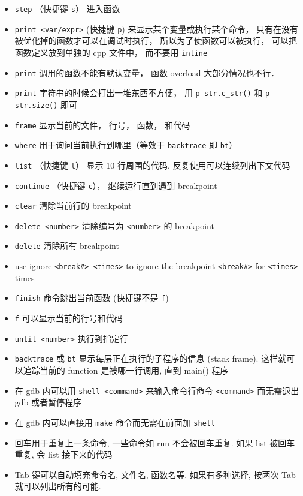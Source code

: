 \begin{itemize}
\item \verb`step` （快捷键 \verb`s`） 进入函数
\item \verb`print <var/expr>` (快捷键 \verb`p`) 来显示某个变量或执行某个命令， 只有在没有被优化掉的函数才可以在调试时执行， 所以为了使函数可以被执行， 可以把函数定义放到单独的 cpp 文件中， 而不要用 \verb`inline`
\item \verb`print` 调用的函数不能有默认变量， 函数 overload 大部分情况也不行．
\item \verb`print` 字符串的时候会打出一堆东西不方便， 用 \verb`p str.c_str()` 和 \verb`p str.size()` 即可
\item \verb`frame` 显示当前的文件， 行号， 函数， 和代码
\item \verb`where` 用于询问当前执行到哪里（等效于 \verb`backtrace` 即 \verb`bt`）
\item \verb`list` （快捷键 \verb`l`） 显示 10 行周围的代码, 反复使用可以连续列出下文代码
\item \verb`continue` （快捷键 \verb`c`）， 继续运行直到遇到 breakpoint
\item \verb`clear` 清除当前行的 breakpoint
\item \verb`delete <number>` 清除编号为 \verb`<number>` 的 breakpoint
\item \verb`delete` 清除所有 breakpoint
\item use ignore \verb`<break#> <times>` to ignore the breakpoint \verb`<break#>` for \verb`<times>` times
\item \verb`finish` 命令跳出当前函数 (快捷键不是 \verb`f`)
\item \verb`f` 可以显示当前的行号和代码
\item \verb`until <number>` 执行到指定行
\item \verb`backtrace` 或 \verb`bt` 显示每层正在执行的子程序的信息 (stack frame). 这样就可以追踪当前的 function 是被哪一行调用, 直到 main() 程序

\item 在 gdb 内可以用 \verb`shell <command>` 来输入命令行命令 \verb`<command>` 而无需退出 gdb 或者暂停程序
\item 在 gdb 内可以直接用 \verb`make` 命令而无需在前面加 \verb`shell`
\item 回车用于重复上一条命令, 一些命令如 run 不会被回车重复. 如果 list 被回车重复, 会 list 接下来的代码
\item Tab 键可以自动填充命令名, 文件名, 函数名等. 如果有多种选择, 按两次 Tab 就可以列出所有的可能.
\end{itemize}

